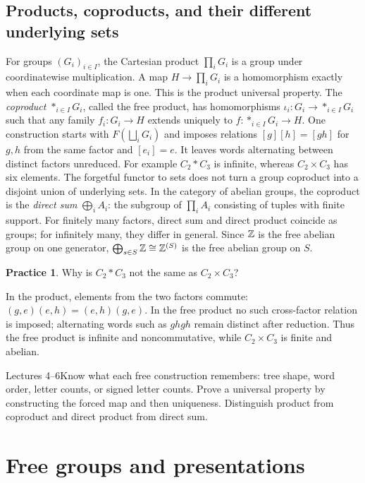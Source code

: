 \documentclass[11pt,openany]{book}
\theoremstyle{definition}
\newtheorem{exercise}[theorem]{Practice}
\begin{document}
\section{Products, coproducts, and their different underlying sets}
For groups $(G_i)_{i\in I}$, the Cartesian product $\prod_iG_i$ is a group under coordinatewise multiplication. A map $H\to\prod_iG_i$ is a homomorphism exactly when each coordinate map is one. This is the product universal property. The \emph{coproduct} $*_{i\in I}G_i$, called the free product, has homomorphisms $\iota_i:G_i\to *_{i\in I}G_i$ such that any family $f_i:G_i\to H$ extends uniquely to $f:*_{i\in I}G_i\to H$.
One construction starts with $F(\bigsqcup_iG_i)$ and imposes relations $[g][h]=[gh]$ for $g,h$ from the same factor and $[e_i]=e$. It leaves words alternating between distinct factors unreduced. For example $C_2*C_3$ is infinite, whereas $C_2\times C_3$ has six elements. The forgetful functor to sets does not turn a group coproduct into a disjoint union of underlying sets.
In the category of abelian groups, the coproduct is the \emph{direct sum} $\bigoplus_i A_i$: the subgroup of $\prod_iA_i$ consisting of tuples with finite support. For finitely many factors, direct sum and direct product coincide as groups; for infinitely many, they differ in general. Since $\mathbb Z$ is the free abelian group on one generator, $\bigoplus_{s\in S}\mathbb Z\cong\mathbb Z^{(S)}$ is the free abelian group on $S$.
\begin{exercise}Why is $C_2*C_3$ not the same as $C_2\times C_3$?\end{exercise}
\begin{solution}In the product, elements from the two factors commute: $(g,e)(e,h)=(e,h)(g,e)$. In the free product no such cross-factor relation is imposed; alternating words such as $ghgh$ remain distinct after reduction. Thus the free product is infinite and noncommutative, while $C_2\times C_3$ is finite and abelian.\end{solution}
\begin{checkpoint}{Lectures 4--6}Know what each free construction remembers: tree shape, word order, letter counts, or signed letter counts. Prove a universal property by constructing the forced map and then uniqueness. Distinguish product from coproduct and direct product from direct sum.\end{checkpoint}


\chapter{Free groups and presentations}
\end{document}
